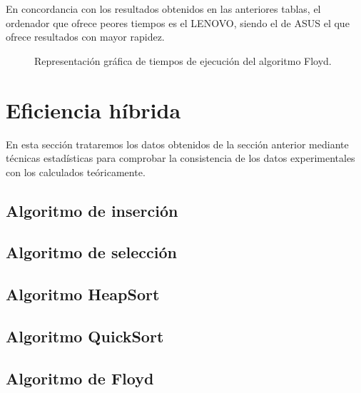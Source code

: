 \documentclass{homework}
\begin{document}
    En concordancia con los resultados obtenidos en las anteriores tablas, el ordenador que ofrece peores
    tiempos es el LENOVO, siendo el de ASUS el que ofrece resultados con mayor rapidez. 

    \begin{figure}[h]
        \centering
        \caption{Representación gráfica de tiempos de ejecución del algoritmo Floyd.}
        \label{emp:floyd}
       \end{figure}

    \section{Eficiencia híbrida}
    
    En esta sección trataremos los datos obtenidos de la sección anterior mediante técnicas estadísticas para
    comprobar la consistencia de los datos experimentales con los calculados teóricamente.  

    \subsection{Algoritmo de inserción}
    \subsection{Algoritmo de selección}
    \subsection{Algoritmo HeapSort}
    \subsection{Algoritmo QuickSort}
    \subsection{Algoritmo de Floyd}

    
\end{document}
